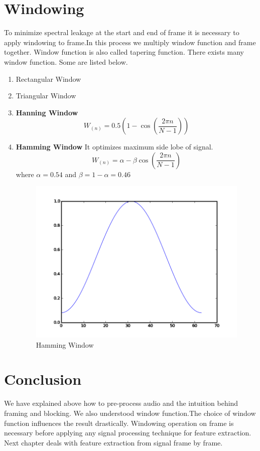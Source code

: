 \documentclass[11pt]{report}
\begin{document}
\section{Windowing}
To minimize spectral leakage at the start and end of frame it is necessary to apply windowing to frame.In this process we multiply window function and frame together. Window function is also called tapering function.
There exists many window function. Some are listed below.
\begin{enumerate}
\item Rectangular Window
\item Triangular Window
\item \textbf{Hanning Window}
\begin{equation}
W_(n)=0.5(1-  \cos(\frac{2\pi n}{N-1}))
\end{equation}
\item \textbf{Hamming Window} It optimizes maximum side lobe of signal.
\begin{equation}
W_(n)=\alpha -\beta \cos(\frac{2\pi n}{N-1})
\end{equation}
where $\alpha =0.54$ and $\beta =1- \alpha=0.46$
\begin{figure}[h]
\centering
\includegraphics[scale=.50]{./images/hamm.png}
\caption{Hamming Window}

\end{figure}
\end{enumerate} 

\section{Conclusion}  We have explained above how to pre-process audio and the intuition behind framing and blocking. We also understood window function.The choice of window function influences the result drastically. Windowing operation on frame is necessary before applying any signal processing technique for feature extraction. Next chapter deals with feature extraction from signal frame by frame. 
\newpage
\end{document}
